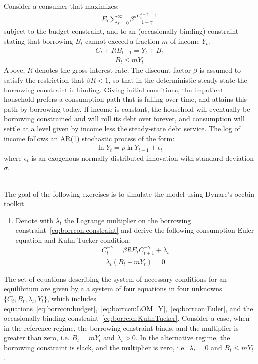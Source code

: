 \documentclass{article}
\begin{document}
Consider a consumer that maximizes:
\begin{align*}
E_t \sum_{s=0}^\infty \beta^s \frac{C_t^{1-\gamma}-1}{1-\gamma}
\end{align*}
subject to the budget constraint, and to an (occasionally binding) constraint stating that borrowing \(B_t\) cannot exceed a fraction \(m\) of income \(Y_t\):
\begin{align}
C_t + R B_{t-1} = Y_t + B_t \label{eq:borrcon:budget}
\end{align}
\begin{align}
B_t \leq m Y_t \label{eq:borrcon:constraint}
\end{align}
Above, \(R\) denotes the gross interest rate.
The discount factor \(\beta \) is assumed to satisfy the restriction that \(\beta R <1\),
  so that in the deterministic steady-state the borrowing constraint is binding.
Giving initial conditions, the impatient household prefers a consumption path that is falling over time,
  and attains this path by borrowing today.
If income is constant, the household will eventually be borrowing constrained and will roll its debt over forever,
  and consumption will settle at a level given by income less the steady-state debt service.
The log of income follows an AR{(1)} stochastic process of the form:
\begin{align}
\ln Y_t = \rho \ln Y_{t-1} + \epsilon_t \label{eq:borrcon:LOM_Y}
\end{align}
where \(\epsilon_t\) is an exogenous normally distributed innovation with standard deviation \(\sigma \).

\noindent~\\The goal of the following exercises is to simulate the model using Dynare's occbin toolkit.

\begin{enumerate}
\item
Denote with \(\lambda_t\) the Lagrange multiplier on the borrowing constraint~\eqref{eq:borrcon:constraint} and
  derive the following consumption Euler equation and Kuhn-Tucker condition:
\begin{align}
C_t^{-\gamma} = \beta R E_t C_{t+1}^{-\gamma} + \lambda_t \label{eq:borrcon:Euler}
\end{align}
\begin{align}
\lambda_t (B_t - mY_t) = 0 \label{eq:borrcon:KuhnTucker}
\end{align}
\end{enumerate}

The set of equations describing the system of necessary conditions for an equilibrium are given by a
  a system of four equations in four unknowns \({\{ C_t,B_t,\lambda_t,Y_t \}}\),
  which includes equations~\eqref{eq:borrcon:budget},~\eqref{eq:borrcon:LOM_Y},~\eqref{eq:borrcon:Euler},
  and the occasionally binding constraint~\eqref{eq:borrcon:KuhnTucker}.
Consider a case, when in the reference regime, the borrowing constraint binds,
  and the multiplier is greater than zero, i.e. \(B_t=mY_t\) and \(\lambda_t>0\).
In the alternative regime, the borrowing constraint is slack, and the multiplier is zero, i.e.\
  \(\lambda_t=0\) and \(B_t\leq m Y_t\).
\end{document}
